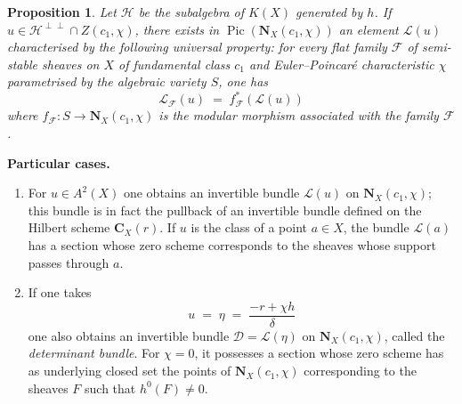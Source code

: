 \documentclass[12pt,english]{smfart}%
\theoremstyle{plain}
\newtheorem{proposition}[theorem]{Proposition}
\theoremstyle{definition}
\theoremstyle{remark}
\DeclareMathOperator{\Pic}{Pic}
\begin{document}
\begin{proposition}\label{prop:Lu}
Let $\mathscr{H}$ be the subalgebra of $K(X)$ generated by $h$. If $u\in\mathscr{H}^{\perp\perp}\cap Z(c_{1},\chi)$, there exists in $\Pic(\mathbf{N}_{X}(c_{1},\chi))$ an element $\mathscr{L}(u)$ characterised by the following universal property: for every flat family $\mathscr{F}$ of semi-stable sheaves on $X$ of fundamental class $c_{1}$ and Euler--Poincar\'e characteristic $\chi$ parametrised by the algebraic variety $S$, one has
\[
\mathscr{L}_{\mathscr{F}}(u) \;=\; f_{\mathscr{F}}^{*}(\mathscr{L}(u))
\]
where $f_{\mathscr{F}}:S\to\mathbf{N}_{X}(c_{1},\chi)$ is the modular morphism associated with the family $\mathscr{F}$.
\end{proposition}

\medskip
\noindent\textbf{Particular cases.}
\begin{enumerate}
\item For $u\in A^{2}(X)$ one obtains an invertible bundle $\mathscr{L}(u)$ on $\mathbf{N}_{X}(c_{1},\chi)$; this bundle is in fact the pullback of an invertible bundle defined on the Hilbert scheme $\mathbf{C}_{X}(r)$. If $u$ is the class of a point $a\in X$, the bundle $\mathscr{L}(a)$ has a section whose zero scheme corresponds to the sheaves whose support passes through $a$.

\item If one takes
\[
u \;=\; \eta \;=\; \frac{-r+\chi h}{\delta}
\]
one also obtains an invertible bundle $\mathscr{D}=\mathscr{L}(\eta)$ on $\mathbf{N}_{X}(c_{1},\chi)$, called the \emph{determinant bundle}. For $\chi=0$, it possesses a section whose zero scheme has as underlying closed set the points of $\mathbf{N}_{X}(c_{1},\chi)$ corresponding to the sheaves $F$ such that $h^{0}(F)\neq 0$.
\end{enumerate}
\end{document}

